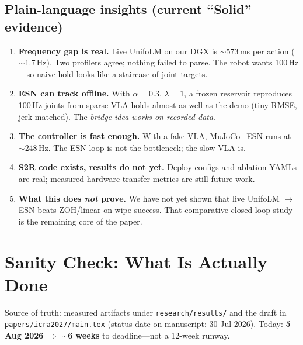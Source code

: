 \documentclass[conference]{IEEEtran}
\begin{document}
\subsection{Plain-language insights (current ``Solid'' evidence)}
\begin{enumerate}
    \item \textbf{Frequency gap is real.} Live UnifoLM on our DGX is $\sim$573\,ms per action ($\sim$1.7\,Hz). Two profilers agree; nothing failed to parse. The robot wants 100\,Hz---so naive hold looks like a staircase of joint targets.
    \item \textbf{ESN can track offline.} With $\alpha{=}0.3$, $\lambda{=}1$, a frozen reservoir reproduces 100\,Hz joints from sparse VLA holds almost as well as the demo (tiny RMSE, jerk matched). The \emph{bridge idea works on recorded data}.
    \item \textbf{The controller is fast enough.} With a fake VLA, MuJoCo$+$ESN runs at $\sim$248\,Hz. The ESN loop is not the bottleneck; the slow VLA is.
    \item \textbf{S2R code exists, results do not yet.} Deploy configs and ablation YAMLs are real; measured hardware transfer metrics are still future work.
    \item \textbf{What this does \emph{not} prove.} We have not yet shown that live UnifoLM $\to$ ESN beats ZOH/linear on wipe success. That comparative closed-loop study is the remaining core of the paper.
\end{enumerate}

\section{Sanity Check: What Is Actually Done}
\noindent
Source of truth: measured artifacts under \texttt{research/results/} and the draft in \texttt{papers/icra2027/main.tex} (status date on manuscript: 30 Jul 2026).
Today: \textbf{5 Aug 2026} $\Rightarrow$ \textbf{$\sim$6 weeks} to deadline---not a 12-week runway.
\end{document}
